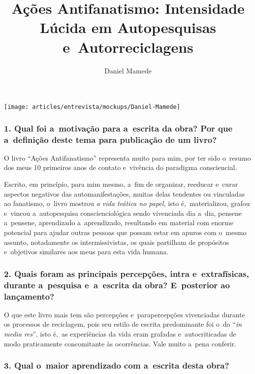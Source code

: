 \documentclass{gescons}
\author{Daniel Mamede}
\title{Ações Antifanatismo: Intensidade Lúcida em Autopesquisas e~Autorreciclagens}
\begin{document}
    \makeentrevistatitle

    \begin{multicols}{2}

\begin{center}
    \texttt{[image: articles/entrevista/mockups/Daniel-Mamede]}
\end{center}


\subsubsection{1. Qual foi a~motivação para a~escrita da obra? Por que a~definição deste tema para publicação de um livro?}

O livro “Ações Antifanatismo” representa muito para mim, por ter sido o~resumo dos meus 10 primeiros anos de contato e~vivência do paradigma consciencial. 

Escrito, em princípio, para mim mesmo, a~fim de organizar, reeducar e~curar aspectos negativos das automanifestações, muitas delas tendentes ou vinculadas ao fanatismo, o~livro mostrou \textit{a vida teática no papel,} isto é,~materializou, grafou e~vincou a~autopesquisa conscienciológica sendo vivenciada dia a~dia, pensene a~pensene, aprendizado a~aprendizado, resultando em material com enorme potencial para ajudar outras pessoas que possam estar em apuros com o~mesmo assunto, notadamente os intermissivistas, os quais partilham de propósitos e~objetivos similares aos meus para esta vida humana.



\subsubsection{2. Quais foram as principais percepções, intra e~extrafísicas, durante a~pesquisa e~a~escrita da obra? E~posterior ao lançamento?}

O que este livro mais tem são percepções e~parapercepções vivenciadas durante os processos de reciclagem, pois seu estilo de escrita predominante foi o~do “\textit{in media res}”, isto é,~as experiências da vida eram grafadas e~autocriticadas de modo praticamente concomitante às ocorrências. Vale muito a~pena conferir. 


\subsubsection{3.       Qual o~maior aprendizado com a~escrita desta obra?}


\end{multicols}
\end{document}
